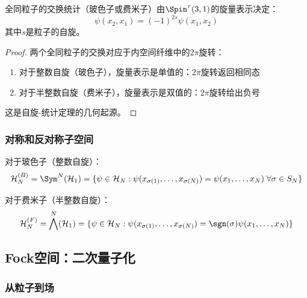 \begin{theorem}
全同粒子的交换统计（玻色子或费米子）由$\Spin^\tau(3,1)$的旋量表示决定：
\begin{equation}
    \psi(x_2, x_1) = (-1)^{2s} \psi(x_1, x_2)
\end{equation}
其中$s$是粒子的自旋。
\end{theorem}

\begin{proof}
两个全同粒子的交换对应于内空间纤维中的$2\pi$旋转：
\begin{enumerate}
    \item 对于整数自旋（玻色子），旋量表示是单值的：$2\pi$旋转返回相同态
    \item 对于半整数自旋（费米子），旋量表示是双值的：$2\pi$旋转给出负号
\end{enumerate}

这是自旋-统计定理的几何起源。
\end{proof}

\subsubsection{对称和反对称子空间}

\begin{definition}[对称子空间]
对于玻色子（整数自旋）：
\begin{equation}
    \mathcal{H}_N^{(B)} = \Sym^N(\mathcal{H}_1) = \{\psi \in \mathcal{H}_N : \psi(x_{\sigma(1)}, \ldots, x_{\sigma(N)}) = \psi(x_1, \ldots, x_N) \; \forall \sigma \in S_N\}
\end{equation}
\end{definition}

\begin{definition}[反对称子空间]
对于费米子（半整数自旋）：
\begin{equation}
    \mathcal{H}_N^{(F)} = \bigwedge^N(\mathcal{H}_1) = \{\psi \in \mathcal{H}_N : \psi(x_{\sigma(1)}, \ldots, x_{\sigma(N)}) = \sgn(\sigma)\psi(x_1, \ldots, x_N)\}
\end{equation}
\end{definition}

\subsection{Fock空间：二次量子化}

\subsubsection{从粒子到场}

